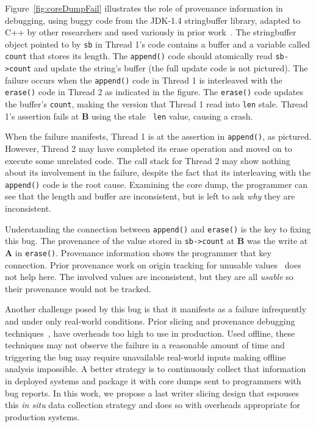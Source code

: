 \documentclass[preprint,9pt]{sigplanconf}
\begin{document}
Figure~\ref{fig:coreDumpFail} illustrates the role of provenance information in
debugging, using buggy code from the JDK-1.4 stringbuffer library, adapted to
C++ by other researchers and used variously in prior
work~\cite{concurrencybugs}.  The stringbuffer object pointed to by {\tt sb} in
Thread 1's code contains a buffer and a variable called {\tt count} that stores
its length.  The {\tt append()} code should atomically read {\tt sb->count} and
update the string's buffer (the full update code is not pictured).  The failure
occurs when the {\tt append()} code in Thread 1 is interleaved with the {\tt
erase()} code in Thread 2 as indicated in the figure.  The {\tt erase()} code
updates the buffer's {\tt count}, making the version that Thread 1 read into
{\tt len} stale.  Thread 1's assertion fails at {\bf B} using the stale {\tt
len} value, causing a crash.  

When the failure manifests, Thread 1 is at the assertion in {\tt append()}, as
pictured.  However, Thread 2 may have completed its erase operation and moved on
to execute some unrelated code.  The call stack for Thread 2 may show nothing
about its involvement in the failure, despite the fact that its interleaving
with the {\tt append()} code is the root cause.  Examining the core dump, the
programmer can see that the length and buffer are inconsistent, but is left to
ask {\em why} they are inconsistent.  

Understanding the connection between {\tt append()} and {\tt erase()} is the
key to fixing this bug.  The provenance of the value stored in {\tt sb->count}
at {\bf B} was the write at {\bf A} in {\tt erase()}.  Provenance information
shows the programmer that key connection.  Prior provenance work on origin
tracking for unusable values~\cite{badapples} does not help here.  The involved
values are inconsistent, but they are all {\em usable} so their provenance
would not be tracked.   

Another challenge posed by this bug is that it manifests as a failure
infrequently and under only real-world conditions.  Prior slicing and
provenance debugging
techniques~\cite{tipslicingsurvey,thinslicing,whylineicse}, have overheads too
high to use in production.  Used offline, these techniques may not observe the
failure in a reasonable amount of time and triggering the bug may require
unavailable real-world inputs making offline analysis impossible.   A better
strategy is to continuously collect that information in deployed systems and
package it with core dumps sent to programmers with bug reports.  In this work,
we propose a last writer slicing design that espouses this {\em in situ} data
collection strategy and does so with overheads appropriate for production
systems.
\end{document}
